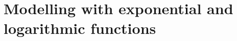 \documentclass[../main.tex]{subfiles}
\begin{document}
\section{Modelling with exponential and logarithmic functions}

\end{document}
